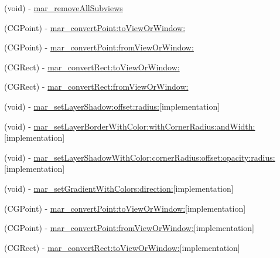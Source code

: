 \begin{DoxyCompactItemize}
\item 
(void) -\/ \hyperlink{category_u_i_view_07_m_a_r_e_x_08_a756c61a918c0eb2024a29b33feb7e1fe}{mar\+\_\+remove\+All\+Subviews}
\item 
(C\+G\+Point) -\/ \hyperlink{category_u_i_view_07_m_a_r_e_x_08_aa7d0c4d5050032bbac130b4acb37607f}{mar\+\_\+convert\+Point\+:to\+View\+Or\+Window\+:}
\item 
(C\+G\+Point) -\/ \hyperlink{category_u_i_view_07_m_a_r_e_x_08_aef393cf3d62c21bd1a1d0fdc27e68bff}{mar\+\_\+convert\+Point\+:from\+View\+Or\+Window\+:}
\item 
(C\+G\+Rect) -\/ \hyperlink{category_u_i_view_07_m_a_r_e_x_08_a5210e91ed27970eda3fc23283e39579f}{mar\+\_\+convert\+Rect\+:to\+View\+Or\+Window\+:}
\item 
(C\+G\+Rect) -\/ \hyperlink{category_u_i_view_07_m_a_r_e_x_08_a136889558c7a94e86577eb7880e5db5b}{mar\+\_\+convert\+Rect\+:from\+View\+Or\+Window\+:}
\item 
(void) -\/ \hyperlink{category_u_i_view_07_m_a_r_e_x_08_ac82e10215ed7bdcf38add5aba3b65edf}{mar\+\_\+set\+Layer\+Shadow\+:offset\+:radius\+:}{\ttfamily  \mbox{[}implementation\mbox{]}}
\item 
(void) -\/ \hyperlink{category_u_i_view_07_m_a_r_e_x_08_a69dead1ee2d6a6ea4dfa8ce62f9ece92}{mar\+\_\+set\+Layer\+Border\+With\+Color\+:with\+Corner\+Radius\+:and\+Width\+:}{\ttfamily  \mbox{[}implementation\mbox{]}}
\item 
(void) -\/ \hyperlink{category_u_i_view_07_m_a_r_e_x_08_af4fb227a79b4a9da89064e9b9e1f2f76}{mar\+\_\+set\+Layer\+Shadow\+With\+Color\+:corner\+Radius\+:offset\+:opacity\+:radius\+:}{\ttfamily  \mbox{[}implementation\mbox{]}}
\item 
(void) -\/ \hyperlink{category_u_i_view_07_m_a_r_e_x_08_ac74a7e8414b92d4bf8a8f7489f77b162}{mar\+\_\+set\+Gradient\+With\+Colors\+:direction\+:}{\ttfamily  \mbox{[}implementation\mbox{]}}
\item 
(C\+G\+Point) -\/ \hyperlink{category_u_i_view_07_m_a_r_e_x_08_a7584650ebf859d31666da3b3c553a87c}{mar\+\_\+convert\+Point\+:to\+View\+Or\+Window\+:}{\ttfamily  \mbox{[}implementation\mbox{]}}
\item 
(C\+G\+Point) -\/ \hyperlink{category_u_i_view_07_m_a_r_e_x_08_a7c06e8f8cfa0ac108deb3fcbeb59fee9}{mar\+\_\+convert\+Point\+:from\+View\+Or\+Window\+:}{\ttfamily  \mbox{[}implementation\mbox{]}}
\item 
(C\+G\+Rect) -\/ \hyperlink{category_u_i_view_07_m_a_r_e_x_08_a3d157378adfeca5638dc69e01f8ca2aa}{mar\+\_\+convert\+Rect\+:to\+View\+Or\+Window\+:}{\ttfamily  \mbox{[}implementation\mbox{]}}

\end{DoxyCompactItemize}
